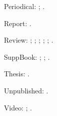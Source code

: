 \documentclass[a4paper,12pt]{report}
\begin{document}
Periodical: \autocite{good:wholeissue}; \autocite{whittington:water}.

Report: \autocite{herwign:office}.

Review: \autocite{ac:comment}; \autocite{bundy:macneil};
\autocite{Clemens:letter}; \autocite{kozinn:review};
\autocite{ratliff:review}; \autocite{wallraff:word}. 

SuppBook: \autocite{friedman:intro}; \autocite{polakow:afterw};
\autocite{prose:intro}.

Thesis: \autocite{murphy:silent}.

Unpublished: \autocite{nass:address}.

Video: \autocite{cleese:holygrail}; \autocite{hitchcock:nbynw}.


\printbibliography[title=References]
\end{document}
